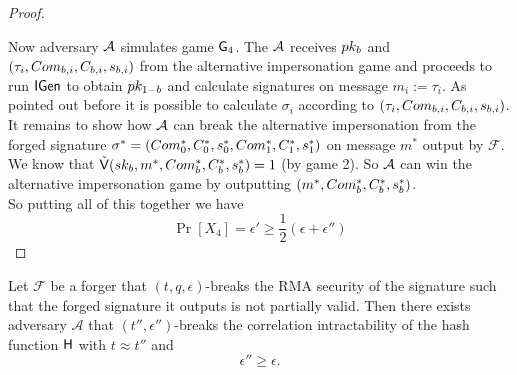 \begin{proof}
\begin{description}[wide,itemindent=\labelsep]
\end{description}

Now adversary $\mathcal{A}$ simulates game $\mathsf{G}_4$. The $\mathcal{A}$ receives $pk_{b}$ and $(\tau_i, Com_{b,i},C_{b,i},s_{b,i})$ from the alternative impersonation game and proceeds to
run $\mathsf{IGen}$ to obtain $pk_{1-b}$ and
 calculate signatures on message $m_i := \tau_i$. As pointed out before it is possible to calculate $\sigma_i$ according to $(\tau_i, Com_{b,i},C_{b,i},s_{b,i})$.
\\
It remains to show how $\mathcal{A}$ can break the alternative impersonation from the forged signature
$\sigma^* = (Com^*_{0},C^*_{0},s^*_{0}, Com^*_{1}, C^*_{1},s^*_{1})$ on message $m^*$ output by $\mathcal{F}$. We know that $\tilde{\mathsf{V}}(sk_b,m^*,Com^*_b,C^*_b,s^*_b) =1$ (by game 2).  So $\mathcal{A}$ can win the alternative impersonation game by outputting $(m^*,Com^*_b,C^*_b,s^*_b)$.
\\
So putting all of this together we have 
$$\Pr[X_4] = \epsilon' \geq \frac{1}{2}(\epsilon + \epsilon'')$$
\end{proof}

\begin{lemma}
Let $\mathcal{F}$ be a forger that $(t,q,\epsilon)$-breaks the RMA security of the signature such that the forged signature it outputs is not partially valid. Then there exists adversary $\mathcal{A}$ that $(t'',\epsilon'')$-breaks the correlation intractability of the hash function $\mathsf{H}$ with 
$t \approx t''$ and 
$$\epsilon'' \geq \epsilon.$$
\end{lemma}

